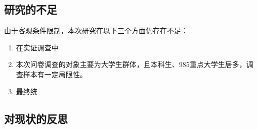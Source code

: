 \documentclass[12pt,UTF8]{ctexart}
\begin{document}
\begin{spacing}{1.25}
\subsection{研究的不足}
由于客观条件限制，本次研究在以下三个方面仍存在不足：
\begin{enumerate}[(1)]
    \item 在实证调查中
    \item 本次问卷调查的对象主要为大学生群体，且本科生、985重点大学生居多，调查样本有一定局限性。
    \item 最终统
\end{enumerate}

\subsection{对现状的反思}
\newpage
\end{spacing}
\nocite{*}


\appendix
\end{document}
